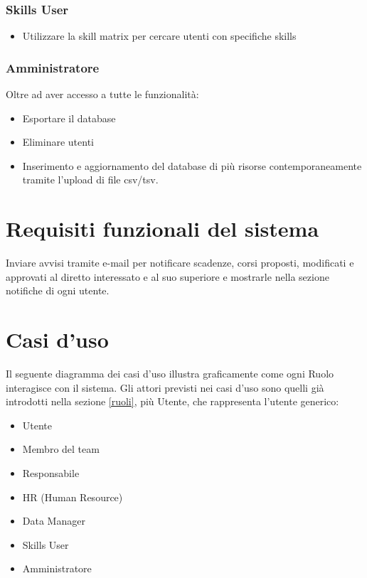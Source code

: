 
\subsubsection{Skills User}
\begin{itemize}
    \item Utilizzare la skill matrix per cercare utenti con specifiche skills
\end{itemize}

\subsubsection{Amministratore}
Oltre ad aver accesso a tutte le funzionalità:
\begin{itemize}
    \item Esportare il database
    \item Eliminare utenti
    \item Inserimento e aggiornamento del database di più risorse contemporaneamente tramite l'upload di file csv/tsv.
\end{itemize}



\section{Requisiti funzionali del sistema}
Inviare avvisi tramite e-mail per notificare scadenze, corsi proposti, modificati e approvati al diretto interessato e al suo superiore e mostrarle nella sezione notifiche di ogni utente.

\section{Casi d’uso}
Il seguente diagramma dei casi d’uso illustra graficamente come ogni Ruolo interagisce con il sistema. Gli attori previsti nei casi d’uso sono quelli già introdotti nella sezione \ref{ruoli}, più Utente, che rappresenta l’utente generico:
\begin{itemize}
    \item Utente
    \item Membro del team
    \item Responsabile
    \item HR (Human Resource)
    \item Data Manager
    \item Skills User
    \item Amministratore
\end{itemize}


